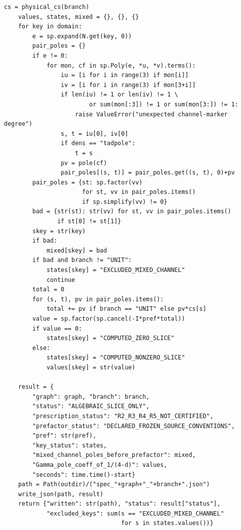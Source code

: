 \documentclass[11pt,a4paper]{article}
\theoremstyle{plain}
\theoremstyle{definition}
\theoremstyle{remark}
\numberwithin{equation}{section}
\begin{document}
\begin{lstlisting}[caption={Consolidated exact checker and coverage-aware optional replay.},
                  label={lst:program}]
    cs = physical_cs(branch)
    values, states, mixed = {}, {}, {}
    for key in domain:
        e = sp.expand(N.get(key, 0))
        pair_poles = {}
        if e != 0:
            for mon, cf in sp.Poly(e, *u, *v).terms():
                iu = [i for i in range(3) if mon[i]]
                iv = [i for i in range(3) if mon[3+i]]
                if len(iu) != 1 or len(iv) != 1 \
                        or sum(mon[:3]) != 1 or sum(mon[3:]) != 1:
                    raise ValueError("unexpected channel-marker degree")
                s, t = iu[0], iv[0]
                if dens == "tadpole":
                    t = s
                pv = pole(cf)
                pair_poles[(s, t)] = pair_poles.get((s, t), 0)+pv
        pair_poles = {st: sp.factor(vv)
                      for st, vv in pair_poles.items()
                      if sp.simplify(vv) != 0}
        bad = {str(st): str(vv) for st, vv in pair_poles.items()
               if st[0] != st[1]}
        skey = str(key)
        if bad:
            mixed[skey] = bad
        if bad and branch != "UNIT":
            states[skey] = "EXCLUDED_MIXED_CHANNEL"
            continue
        total = 0
        for (s, t), pv in pair_poles.items():
            total += pv if branch == "UNIT" else pv*cs[s]
        value = sp.factor(sp.cancel(-I*pref*total))
        if value == 0:
            states[skey] = "COMPUTED_ZERO_SLICE"
        else:
            states[skey] = "COMPUTED_NONZERO_SLICE"
            values[skey] = str(value)

    result = {
        "graph": graph, "branch": branch,
        "status": "ALGEBRAIC_SLICE_ONLY",
        "prescription_status": "R2_R3_R4_R5_NOT_CERTIFIED",
        "prefactor_status": "DECLARED_FROZEN_SOURCE_CONVENTIONS",
        "pref": str(pref),
        "key_status": states,
        "mixed_channel_poles_before_prefactor": mixed,
        "Gamma_pole_coeff_of_1/(4-d)": values,
        "seconds": time.time()-start}
    path = Path(outdir)/("spec_"+graph+"_"+branch+".json")
    write_json(path, result)
    return {"written": str(path), "status": result["status"],
            "excluded_keys": sum(s == "EXCLUDED_MIXED_CHANNEL"
                                 for s in states.values())}



\end{lstlisting}
\end{document}
